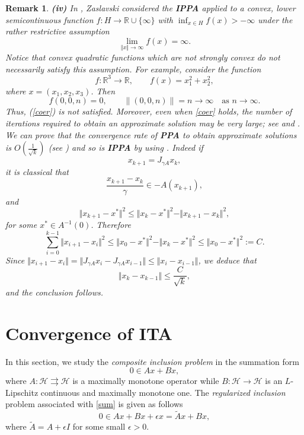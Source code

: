 \documentclass[12pt]{article}
\def\beq{\begin{equation}}
\def\eeq{\end{equation}}
\theoremstyle{plain}
\newtheorem{remark}{Remark}
\newcommand{\R}{{\mathbb R}}
\begin{document}
\begin{remark}
{{\bf(iv) }  {In  \cite{zas10}, Zaslavski considered the {\bf IPPA} applied to a convex, lower semicontinuous function $f: H\to \R\cup \{\infty\}$ with $\inf_{x\in H} f(x)>-\infty$ under the rather restrictive assumption
\beq\label{coer}
\lim_{\Vert x \Vert\to \infty} f(x)=\infty.
\eeq
Notice that convex quadratic functions which are not strongly convex do not necessarily satisfy this assumption. For example, consider the function
$$
f:\mathbb{R}^3\to\mathbb{R},
\qquad
f(x)=x_1^2+x_2^2,
$$
where $x=(x_1,x_2,x_3)$. Then
$$
f(0,0,n)=0,
\qquad
\|(0,0,n)\|=n\to\infty
\quad\text{as }n\to\infty.
$$
Thus, (\ref{coer}) is not satisfied.
 Moreover, even when \eqref{coer} holds, the number of iterations required to obtain an approximate solution may be very large; see \cite[Theorem 1.1]{zas10} and \cite[Theorem 1.1]{zas12}.  We can prove that the convergence rate of {\bf PPA} to obtain approximate solutions is $O(\frac{1}{\sqrt{k}})$ (see \cite{Brezis,Gu}) and so is {\bf IPPA} by using \cite[Lemma 2.4]{zas12}. Indeed if 
 $$
 x_{k+1}=J_{\gamma {A}}x_k,
 $$
 it is classical that 
 $$
 \frac{ x_{k+1}- x_{k}}{\gamma}\in -A( x_{k+1}),
 $$
 and
 $$
 \Vert x_{k+1}-x^*\Vert^2\le  \Vert x_{k}-x^*\Vert^2- \Vert x_{k+1}-x_k\Vert^2,
 $$
 for some $x^*\in A^{-1}(0)$.
 Therefore
 $$
 \sum_{i=0}^{k-1}\Vert x_{i+1}-x_i\Vert^2\le \Vert x_0-x^*\Vert^2-\Vert x_{k}-x^*\Vert^2\le \Vert x_0-x^*\Vert^2:=C.
 $$
 Since $\Vert x_{i+1}-x_i\Vert=\Vert J_{\gamma A}x_{i}-J_{\gamma A}x_{i-1}\Vert\le \Vert x_{i} -x_{i-1}\Vert$, we deduce that 
 $$
\Vert x_{k}-x_{k-1}\Vert\le \frac{C}{\sqrt{k}},
 $$
 and the conclusion follows. 
}

}
\end{remark}

\section{Convergence of \textbf{ITA}}\label{s4}

In this section, we study the {\it composite inclusion problem} in the summation form 
\beq\label{sum}
0\in Ax+Bx,
\eeq
where $A:\mathcal{H}\rightrightarrows \mathcal{H}$ is a maximally monotone operator while $B:\mathcal{H}\to\mathcal{H}$ is an $L$-Lipschitz continuous and maximally monotone one. The {\it regularized inclusion} problem associated with \eqref{sum} is given as follows
\begin{equation}\label{tseng1}
0\in Ax+Bx+\epsilon x
=
\widetilde{A}x+Bx,
\end{equation}
where $\widetilde{A}=A+\epsilon I$ for some small $\epsilon>0$.
\end{document}
